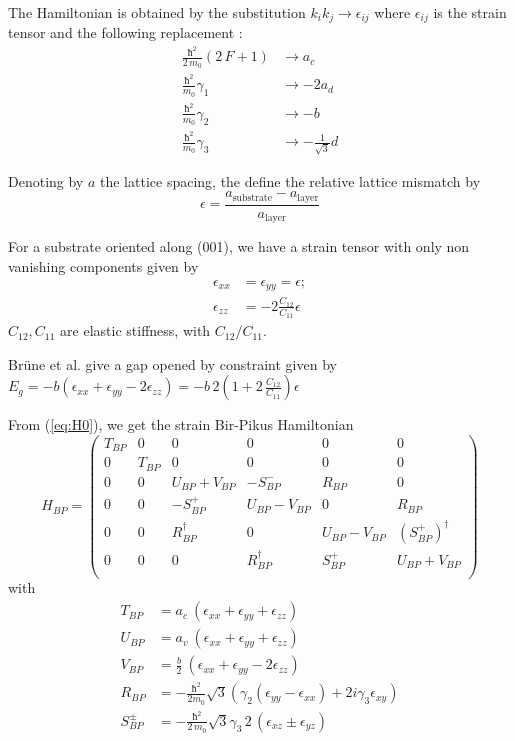 \documentclass[prb,aps]{revtex4}
\begin{document}
		The Hamiltonian is obtained by the substitution $k_i k_j  \to ϵ_{ij} $ where $ϵ_{ij}$ is the strain tensor and the following replacement :
		\begin{align}
			\frac{ħ^2}{2\,m_0} (2\,F+1) &\to a_c\\
			\frac{ħ^2}{ m_0} γ_1&\to - 2 a_d\\
			\frac{ħ^2}{ m_0} γ_2 &\to -  b\\
			\frac{ħ^2}{ m_0} γ_3&\to - \frac{1}{\sqrt{3}} d
		\end{align}

		Denoting by $a$ the lattice spacing, the define the relative lattice mismatch by
		\begin{equation}
		ϵ = \frac{ a_{\textrm{substrate}} - a_{\textrm{layer}} } {a_{\textrm{layer}}}
		\end{equation}

        For a substrate oriented along (001), we have a strain tensor with only non vanishing components given by
		\begin{align}
			ϵ_{xx} &= ϵ_{yy} = ϵ  ;\\
			ϵ_{zz} &= -2 \frac{C_{12}}{C_{11}} ϵ
		\end{align}
		$C_{12},C_{11}$ are elastic stiffness, with $C_{12}/C_{11}$.

		Brüne et al. give a gap opened by constraint given by
		$E_g = -b (ϵ_{xx} + ϵ_{yy} - 2 ϵ_{zz} )  = -b\,2\left(1 + 2\,\frac{C_{12}}{C_{11}}\right) ϵ$

		From (\ref{eq:H0}), we get the strain Bir-Pikus Hamiltonian
		\begin{equation}
			\label{eq:H-BP}
			H_{BP}=
			\begin{pmatrix}
				T_{BP} & 0 & 0 &0 &0 &0     \\
				0 & T_{BP} & 0 & 0 &0 &0   \\
				0 & 0 & U_{BP}+V_{BP} & -S^-_{BP} & R_{BP} & 0  \\
				0 & 0 & - S_{BP}^+ & U_{BP}-V_{BP} & 0& R_{BP} \\
				0& 0 & R_{BP}^\dagger & 0 & U_{BP}-V_{BP} & (S_{BP}^+)^\dagger \\
				0 & 0 & 0 & R_{BP}^\dagger & S_{BP}^+ & U_{BP}+V_{BP}  \\
			\end{pmatrix}
		\end{equation}
		with
		\begin{align}
			T_{BP} &=  a_c~ \left(  ϵ_{xx} + ϵ_{yy} + ϵ_{zz}  \right)  \\
			U_{BP} &= a_v~ \left(  ϵ_{xx} + ϵ_{yy} + ϵ_{zz}  \right)   \\
			V_{BP} &= \frac{b}{2}~ \left(  ϵ_{xx} + ϵ_{yy} -2  ϵ_{zz}  \right)  \\
			R_{BP} &= - \frac{ħ^2 }{2m_0} \sqrt{3} \left( γ_2( ϵ_{yy} - ϵ_{xx}) + 2 i γ_3  ϵ_{xy} \right) \\
			S^\pm_{BP} &= - \frac{ħ^2 }{2\,m_0} \sqrt{3} γ_3\,2\,(ϵ_{xz} \pm ϵ_{yz} )
		\end{align}
\end{document}
